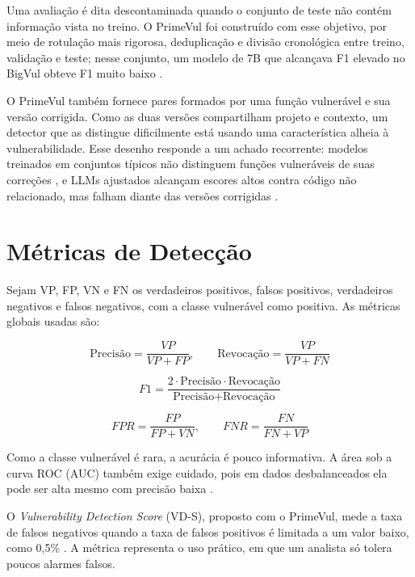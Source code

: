 Uma avaliação é dita descontaminada quando o conjunto de teste não contém informação vista no treino. O PrimeVul foi construído com esse objetivo, por meio de rotulação mais rigorosa, deduplicação e divisão cronológica entre treino, validação e teste; nesse conjunto, um modelo de 7B que alcançava F1 elevado no BigVul obteve F1 muito baixo \cite{ding2024primevul}.

O PrimeVul também fornece pares formados por uma função vulnerável e sua versão corrigida. Como as duas versões compartilham projeto e contexto, um detector que as distingue dificilmente está usando uma característica alheia à vulnerabilidade. Esse desenho responde a um achado recorrente: modelos treinados em conjuntos típicos não distinguem funções vulneráveis de suas correções \cite{risse2024limits}, e LLMs ajustados alcançam escores altos contra código não relacionado, mas falham diante das versões corrigidas \cite{huang2026trap}.

\section{Métricas de Detecção}

Sejam VP, FP, VN e FN os verdadeiros positivos, falsos positivos, verdadeiros negativos e falsos negativos, com a classe vulnerável como positiva. As métricas globais usadas são:

\begin{equation}
\text{Precisão} = \frac{VP}{VP + FP}, \qquad
\text{Revocação} = \frac{VP}{VP + FN}
\end{equation}

\begin{equation}
F1 = \frac{2 \cdot \text{Precisão} \cdot \text{Revocação}}{\text{Precisão} + \text{Revocação}}
\end{equation}

\begin{equation}
FPR = \frac{FP}{FP + VN}, \qquad FNR = \frac{FN}{FN + VP}
\end{equation}

Como a classe vulnerável é rara, a acurácia é pouco informativa. A área sob a curva ROC (AUC) também exige cuidado, pois em dados desbalanceados ela pode ser alta mesmo com precisão baixa \cite{saito2015metrics}.

O \textit{Vulnerability Detection Score} (VD-S), proposto com o PrimeVul, mede a taxa de falsos negativos quando a taxa de falsos positivos é limitada a um valor baixo, como 0,5\% \cite{ding2024primevul}. A métrica representa o uso prático, em que um analista só tolera poucos alarmes falsos.

